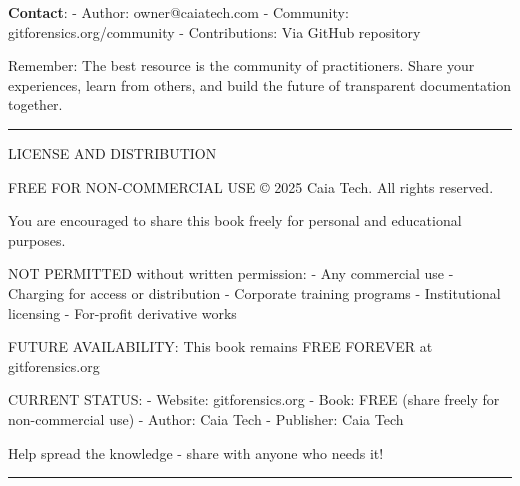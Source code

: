 \textbf{Contact}: - Author: owner@caiatech.com - Community:
gitforensics.org/community - Contributions: Via GitHub repository

Remember: The best resource is the community of practitioners. Share
your experiences, learn from others, and build the future of transparent
documentation together.

\begin{center}\rule{0.5\linewidth}{0.5pt}\end{center}

LICENSE AND DISTRIBUTION

FREE FOR NON-COMMERCIAL USE © 2025 Caia Tech. All rights reserved.

You are encouraged to share this book freely for personal and
educational purposes.

NOT PERMITTED without written permission: - Any commercial use -
Charging for access or distribution - Corporate training programs -
Institutional licensing - For-profit derivative works

FUTURE AVAILABILITY: This book remains FREE FOREVER at gitforensics.org

CURRENT STATUS: - Website: gitforensics.org - Book: FREE (share freely
for non-commercial use) - Author: Caia Tech - Publisher: Caia Tech

Help spread the knowledge - share with anyone who needs it!

\begin{center}\rule{0.5\linewidth}{0.5pt}\end{center}
